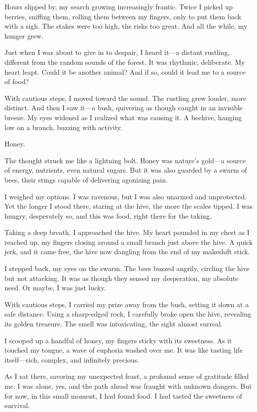 \documentclass[]{article}
\begin{document}
Hours slipped by, my search growing increasingly frantic. Twice I picked up berries, sniffing them, rolling them between my fingers, only to put them back with a sigh. The stakes were too high, the risks too great. And all the while, my hunger grew.

Just when I was about to give in to despair, I heard it—a distant rustling, different from the random sounds of the forest. It was rhythmic, deliberate. My heart leapt. Could it be another animal? And if so, could it lead me to a source of food?

With cautious steps, I moved toward the sound. The rustling grew louder, more distinct. And then I saw it—a bush, quivering as though caught in an invisible breeze. My eyes widened as I realized what was causing it. A beehive, hanging low on a branch, buzzing with activity.

Honey.

The thought struck me like a lightning bolt. Honey was nature's gold—a source of energy, nutrients, even natural sugars. But it was also guarded by a swarm of bees, their stings capable of delivering agonizing pain.

I weighed my options. I was ravenous, but I was also unarmed and unprotected. Yet the longer I stood there, staring at the hive, the more the scales tipped. I was hungry, desperately so, and this was food, right there for the taking.

Taking a deep breath, I approached the hive. My heart pounded in my chest as I reached up, my fingers closing around a small branch just above the hive. A quick jerk, and it came free, the hive now dangling from the end of my makeshift stick.

I stepped back, my eyes on the swarm. The bees buzzed angrily, circling the hive but not attacking. It was as though they sensed my desperation, my absolute need. Or maybe, I was just lucky.

With cautious steps, I carried my prize away from the bush, setting it down at a safe distance. Using a sharp-edged rock, I carefully broke open the hive, revealing its golden treasure. The smell was intoxicating, the sight almost surreal.

I scooped up a handful of honey, my fingers sticky with its sweetness. As it touched my tongue, a wave of euphoria washed over me. It was like tasting life itself—rich, complex, and infinitely precious.

As I sat there, savoring my unexpected feast, a profound sense of gratitude filled me. I was alone, yes, and the path ahead was fraught with unknown dangers. But for now, in this small moment, I had found food. I had tasted the sweetness of survival.
\end{document}
